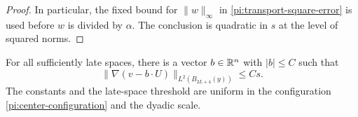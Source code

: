\begin{proof}
In particular, the fixed bound for $\|w\|_\infty$ in
\eqref{pi:transport-square-error} is used before $w$ is divided
by $\alpha$.  The conclusion is quadratic in $s$ at the level
of squared norms.
\end{proof}

\begin{lemma}
\label{pi:sharp-projection}
For all sufficiently late spaces, there is a vector $b\in\mathbb R^n$
with $|b|\le C$ such that
\begin{equation}
 \|\nabla(v-b\cdot U)\|_{L^2(B_{2L+4}(y))}\le Cs.
 \label{pi:sharp-projection-equation}
\end{equation}
The constants and the late-space threshold are uniform in the
configuration \eqref{pi:center-configuration} and the dyadic scale.
\end{lemma}

